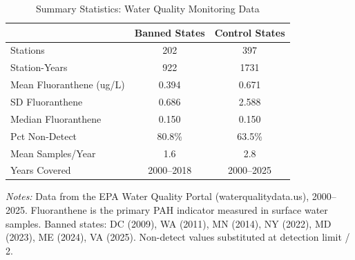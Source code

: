 \begin{table}[htbp]
\centering
\caption{Summary Statistics: Water Quality Monitoring Data}
\label{tab:summary}
\begin{tabular}{lcc}
\toprule
 & Banned States & Control States \\
\midrule
Stations & 202 & 397 \\
Station-Years &  922 & 1731 \\
Mean Fluoranthene (ug/L) & 0.394 & 0.671 \\
SD Fluoranthene & 0.686 & 2.588 \\
Median Fluoranthene & 0.150 & 0.150 \\
Pct Non-Detect & 80.8\% & 63.5\% \\
Mean Samples/Year & 1.6 & 2.8 \\
Years Covered & 2000--2018 & 2000--2025 \\
\bottomrule
\end{tabular}
\begin{tablenotes}
\item \textit{Notes:} Data from the EPA Water Quality Portal (waterqualitydata.us), 2000--2025. 
Fluoranthene is the primary PAH indicator measured in surface water samples. 
Banned states: DC (2009), WA (2011), MN (2014), NY (2022), MD (2023), ME (2024), VA (2025). 
Non-detect values substituted at detection limit / 2.
\end{tablenotes}
\end{table}
